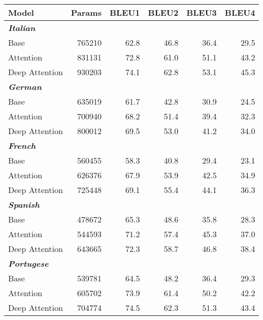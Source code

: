 \begin{tabular}{lrrrrr}
\toprule
          Model &  Params &  BLEU1 &  BLEU2 &  BLEU3 &  BLEU4 \\
\midrule
\textit{\textbf{Italian}} &         &        &        &        &        \\ 
           Base &  765210 &   62.8 &   46.8 &   36.4 &   29.5 \\
      Attention &  831131 &   72.8 &   61.0 &   51.1 &   43.2 \\
 Deep Attention &  930203 &   74.1 &   62.8 &   53.1 &   45.3 \\
\midrule
\textit{\textbf{German}} &         &        &        &        &        \\ 
           Base &  635019 &   61.7 &   42.8 &   30.9 &   24.5 \\
      Attention &  700940 &   68.2 &   51.4 &   39.4 &   32.3 \\
 Deep Attention &  800012 &   69.5 &   53.0 &   41.2 &   34.0 \\
\midrule
\textit{\textbf{French}} &         &        &        &        &        \\ 
           Base &  560455 &   58.3 &   40.8 &   29.4 &   23.1 \\
      Attention &  626376 &   67.9 &   53.9 &   42.5 &   34.9 \\
 Deep Attention &  725448 &   69.1 &   55.4 &   44.1 &   36.3 \\
\midrule
\textit{\textbf{Spanish}}&         &        &        &        &        \\ 
           Base &  478672 &   65.3 &   48.6 &   35.8 &   28.3 \\
      Attention &  544593 &   71.2 &   57.4 &   45.3 &   37.0 \\
 Deep Attention &  643665 &   72.3 &   58.7 &   46.8 &   38.4 \\
\midrule
\textit{\textbf{Portugese}}&         &        &        &        &        \\ 
           Base &  539781 &   64.5 &   48.2 &   36.4 &   29.3 \\
      Attention &  605702 &   73.9 &   61.4 &   50.2 &   42.2 \\
 Deep Attention &  704774 &   74.5 &   62.3 &   51.3 &   43.4 \\
\bottomrule
\end{tabular}
